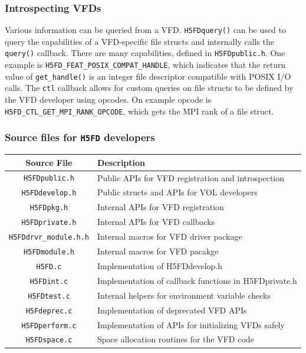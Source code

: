 \subsubsection{Introspecting VFDs}

Various information can be queried from a VFD. \texttt{H5FDquery()} can be used to query the capabilities of a VFD-specific file structs and internally calls the \texttt{query()} callback. There are many capabilities, defined in \texttt{H5FDpublic.h}. One example is \texttt{H5FD\_FEAT\_POSIX\_COMPAT\_HANDLE}, which indicates that the return value of \texttt{get\_handle()} is an integer file descriptor compatible with POSIX I/O calls. The \texttt{ctl} callback allows for custom queries on file structs to be defined by the VFD developer using opcodes. On example opcode is \texttt{H5FD\_CTL\_GET\_MPI\_RANK\_OPCODE}, which gets the MPI rank of a file struct.

\subsubsection{Source files for \texttt{H5FD} developers}

\begin{table}[!ht]
\begin{tabular}{||c|l||}
\hline
\textbf{Source File} & \textbf{Description} \\  [0.5ex] 
\hline\hline
\texttt{H5FDpublic.h} & Public APIs for VFD registration and introspection \\
\texttt{H5FDdevelop.h} & Public structs and APIs for VOL developers \\
\texttt{H5FDpkg.h} & Internal APIs for VFD registration \\
\texttt{H5FDprivate.h} & Internal APIs for VFD callbacks \\
\texttt{H5FDdrvr_module.h.h} & Internal macros for VFD driver package \\
\texttt{H5FDmodule.h} & Internal macros for VFD pacakge \\
\texttt{H5FD.c} & Implementation of H5FDdevelop.h \\
\texttt{H5FDint.c} & Implementation of callback functions in H5FDprivate.h \\
\texttt{H5FDtest.c} & Internal helpers for environment variable checks \\
\texttt{H5Fdeprec.c} & Implementation of deprecated VFD APIs \\
\texttt{H5FDperform.c} & Implementation of APIs for initializing VFDs safely \\
\texttt{H5FDspace.c} & Space allocation routines for the VFD code \\
\hline
\end{tabular}
\label{table:VFD_src_files}
\end{table}


